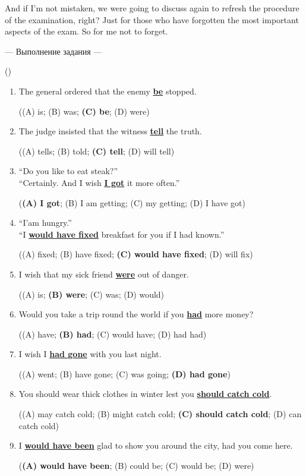 \documentclass[main.tex]{subfiles}
\begin{document}
And if I'm not mistaken, we were going to discuss again to refresh the procedure of the examination, right?
Just for those who have forgotten the most important aspects of the exam.
So for me not to forget.

\newpage
{}

\hypertarget{ltask:2024-03-20}{--- Выполнение задания ---} (\hyperref[task:2024-03-20]{\color{blue}{перейти к тексту задания}})
\\


\begin{enumerate}[nosep,leftmargin=*]
	\itemsep\eitsp
	\item The general ordered that the enemy \uline{\textbf{be}} stopped.
	
		((A) is; (B) was; \textbf{(C) be}; (D) were)
	\item The judge insisted that the witness \uline{\textbf{tell}} the truth.
	
		((A) tells; (B) told; \textbf{(C) tell}; (D) will tell)
	\item ``Do you like to eat steak?''\\``Certainly. And I wish \uline{\textbf{I got}} it more often.''
	
		(\textbf{(A) I got}; (B) I am getting; (C) my getting; (D) I have got)
	\item ``I'am hungry.''\\``I \uline{\textbf{would have fixed}} breakfast for you if I had known.''
	
		((A) fixed; (B) have fixed; \textbf{(C) would have fixed}; (D) will fix)
	\item I wish that my sick friend \uline{\textbf{were}} out of danger.
	
		((A) is; \textbf{(B) were}; (C) was; (D) would)
	\item Would you take a trip round the world if you \uline{\textbf{had}} more money?
	
		((A) have; \textbf{(B) had}; (C) would have; (D) had had)
	\item I wish I \uline{\textbf{had gone}} with you last night.
	
		((A) went; (B) have gone; (C) was going; \textbf{(D) had gone})
	\item You should wear thick clothes in winter lest you \uline{\textbf{should catch cold}}.
	
		((A) may catch cold; (B) might catch cold; \textbf{(C) should catch cold}; (D) can catch cold)
	\item I \uline{\textbf{would have been}} glad to show you around the city, had you come here.
	
		(\textbf{(A) would have been}; (B) could be; (C) would be; (D) were)
\end{enumerate}
\ 
\end{document}
